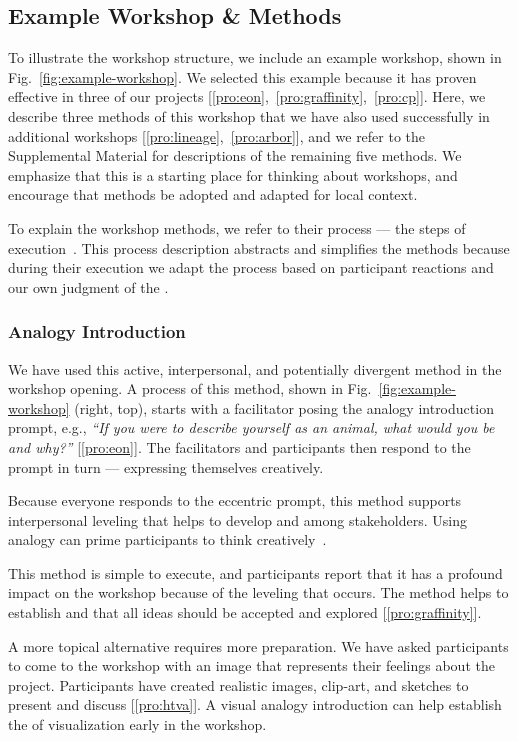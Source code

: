 \subsection{Example Workshop \& Methods}
\label{sec:workshop-methods}
To illustrate the workshop structure, we include an example workshop, shown in Fig.~\ref{fig:example-workshop}. We selected this example because it has proven effective in three of our projects [\ref{pro:eon},~\ref{pro:graffinity},~\ref{pro:cp}]. Here, we describe three methods of this workshop that we have also used successfully in additional workshops [\ref{pro:lineage},~\ref{pro:arbor}], and we refer to the Supplemental Material for descriptions of the remaining five methods. We emphasize that this is a starting place for thinking about workshops, and encourage that methods be adopted and adapted for local context.

To explain the workshop methods, we refer to their process --- the steps of execution~\cite{Biskjaer2017}. This process description abstracts and simplifies the methods because during their execution we adapt the process based on participant reactions and our own judgment of the \tactics. 

\subsubsection*{Analogy Introduction} 

We have used this active, interpersonal, and potentially divergent method in the workshop opening. A process of this method, shown in Fig.~\ref{fig:example-workshop} (right, top), starts with a facilitator posing the analogy introduction prompt, e.g., \emph{``If you were to describe yourself as an animal, what would you be and why?''} [\ref{pro:eon}]. The facilitators and participants then respond to the prompt in turn --- expressing themselves creatively. 

Because everyone responds to the eccentric prompt, this method supports interpersonal leveling that helps to develop \trust and \collegiality among stakeholders. Using analogy can prime participants to think creatively~\cite{Gordon1961}.

This method is simple to execute, and participants report that it has a profound impact on the workshop because of the leveling that occurs. The method helps to establish \trust and that all ideas should be accepted and explored [\ref{pro:graffinity}].

A more topical alternative requires more preparation. We have asked participants to come to the workshop with an image that represents their feelings about the project. Participants have created realistic images, clip-art, and sketches to present and discuss [\ref{pro:htva}]. A visual analogy introduction can help establish the \topic of visualization early in the workshop.

